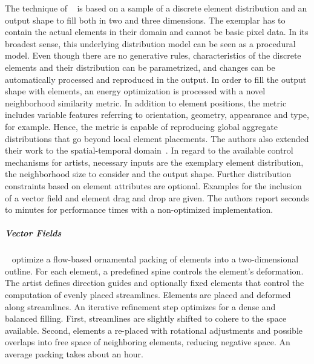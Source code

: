 The technique of \citeauthor*{ma_2011_det}~\cite{ma_2011_det} is based on a sample of a discrete element distribution and an output shape to fill both in two and three dimensions. The exemplar has to contain the actual elements in their domain and cannot be basic pixel data. In its broadest sense, this underlying distribution model can be seen as a procedural model. Even though there are no generative rules, characteristics of the discrete elements and their distribution can be parametrized, and changes can be automatically processed and reproduced in the output. In order to fill the output shape with elements, an energy optimization is processed with a novel neighborhood similarity metric. In addition to element positions, the metric includes  variable features referring to orientation, geometry, appearance and type, for example. Hence, the metric is capable of reproducing global aggregate distributions that go beyond local element placements. The authors also extended their work to the spatial-temporal domain~\cite{ma_2013_det}. In regard to the available control mechanisms for artists, necessary inputs are the exemplary element distribution, the neighborhood size to consider and the output shape. Further distribution constraints based on element attributes are optional. Examples for the inclusion of a vector field and element drag and drop are given. The authors report seconds to minutes for performance times with a non-optimized implementation.






\subparagraph{Vector Fields}
\label{subpara:analysis_element_arrangements_fields}

\citeauthor*{saputra_2017_ffo}~\cite{saputra_2017_ffo} optimize a flow-based ornamental packing of elements into a two-dimensional outline. For each element, a predefined spine controls the element's deformation. The artist defines direction guides and optionally fixed elements that control the computation of evenly placed streamlines. Elements are placed and deformed along streamlines. An iterative refinement step optimizes for a dense and balanced filling. First, streamlines are slightly shifted to cohere to the space available. Second, elements a re-placed with rotational adjustments and possible overlaps into free space of neighboring elements, reducing negative space. An average packing takes about an hour.

